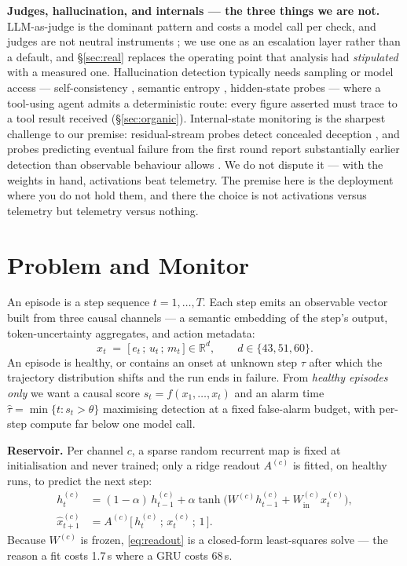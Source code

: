 \documentclass{article}
\begin{document}
\textbf{Judges, hallucination, and internals --- the three things we are not.} LLM-as-judge \cite{zheng2023judging,gu2024survey} is the dominant pattern and costs a model call per check, and judges are not neutral instruments \cite{shi2024judging}; we use one as an escalation layer rather than a default, and \S\ref{sec:real} replaces the operating point that analysis had \emph{stipulated} with a measured one. Hallucination detection \cite{ji2023survey,lin2025hallucination} typically needs sampling or model access --- self-consistency \cite{manakul2023selfcheckgpt}, semantic entropy \cite{farquhar2024detecting}, hidden-state probes \cite{kossen2024semantic} --- where a tool-using agent admits a deterministic route: every figure asserted must trace to a tool result received (\S\ref{sec:organic}). Internal-state monitoring is the sharpest challenge to our premise: residual-stream probes detect concealed deception \cite{goldowskydill2025detecting}, and probes predicting eventual failure from the first round report substantially earlier detection than observable behaviour allows \cite{ruan2026doomed}. We do not dispute it --- with the weights in hand, activations beat telemetry. The premise here is the deployment where you do not hold them, and there the choice is not activations versus telemetry but telemetry versus nothing.

\section{Problem and Monitor}
\label{sec:method}

An episode is a step sequence $t=1,\dots,T$. Each step emits an observable
vector built from three causal channels --- a semantic embedding of the step's
output, token-uncertainty aggregates, and action metadata:
%
\begin{equation}
x_t \;=\; \big[\,e_t \,;\, u_t \,;\, m_t\,\big] \in \mathbb{R}^{d},
\qquad d \in \{43, 51, 60\}.
\label{eq:telemetry}
\end{equation}
%
An episode is healthy, or contains an onset at unknown step $\tau$ after which
the trajectory distribution shifts and the run ends in failure. From
\emph{healthy episodes only} we want a causal score $s_t = f(x_1,\dots,x_t)$ and
an alarm time $\hat{\tau} = \min\{t : s_t > \theta\}$ maximising detection at a
fixed false-alarm budget, with per-step compute far below one model call.

\textbf{Reservoir.} Per channel $c$, a sparse random recurrent map is fixed at
initialisation and never trained; only a ridge readout $A^{(c)}$ is fitted, on
healthy runs, to predict the next step:
%
\begin{align}
h^{(c)}_t &= (1-\alpha)\,h^{(c)}_{t-1} + \alpha \tanh\!\big(W^{(c)} h^{(c)}_{t-1} + W^{(c)}_{\mathrm{in}} x^{(c)}_t\big), \label{eq:reservoir}\\
\hat{x}^{(c)}_{t+1} &= A^{(c)}\big[\,h^{(c)}_t \,;\, x^{(c)}_t \,;\, 1\,\big]. \label{eq:readout}
\end{align}
%
Because $W^{(c)}$ is frozen, \eqref{eq:readout} is a closed-form least-squares
solve --- the reason a fit costs 1.7\,s where a GRU costs 68\,s.
\end{document}
